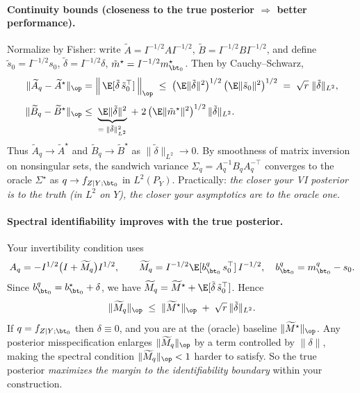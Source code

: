 \paragraph{Continuity bounds (closeness to the true posterior $\Rightarrow$ better performance).}
Normalize by Fisher: write $\widetilde A=I^{-1/2}AI^{-1/2}$, $\widetilde B=I^{-1/2}BI^{-1/2}$, and define $\tilde s_0=I^{-1/2}s_0$, $\tilde\delta=I^{-1/2}\delta$, $\tilde m^\star=I^{-1/2}m^\star_{\bt_0}$.
Then by Cauchy–Schwarz,
\begin{align*}
\|\widetilde A_q-\widetilde A^\star\|_{\op}
&=\Big\|\,\E[\tilde\delta\,\tilde s_0^\top]\,\Big\|_{\op}
\;\le\;\big(\E\|\tilde\delta\|^2\big)^{1/2}\,\big(\E\|\tilde s_0\|^2\big)^{1/2}
\;=\;\sqrt{r}\;\|\tilde\delta\|_{L^2},\\[3pt]
\|\widetilde B_q-\widetilde B^\star\|_{\op}
&\le\;\underbrace{\E\|\tilde\delta\|^2}_{=\;\|\tilde\delta\|_{L^2}^2}
\;+\;2\,\big(\E\|\tilde m^\star\|^2\big)^{1/2}\,\|\tilde\delta\|_{L^2}.
\end{align*}
Thus \(\widetilde A_q\to\widetilde A^\star\) and \(\widetilde B_q\to\widetilde B^\star\) as $\|\tilde\delta\|_{L^2}\to0$.
By smoothness of matrix inversion on nonsingular sets, the sandwich variance
\(\Sigma_q=A_q^{-1}B_qA_q^{-\top}\) converges to the oracle \(\Sigma^\star\) as $q\to f_{Z\mid Y;\bt_0}$ in $L^2(P_Y)$.
Practically: \emph{the closer your VI posterior is to the truth (in $L^2$ on $Y$), the closer your asymptotics are to the oracle one.}

\paragraph{Spectral identifiability improves with the true posterior.}
Your invertibility condition uses
\[
A_q=-I^{1/2}\big(I+\widetilde M_q\big)I^{1/2},\qquad
\widetilde M_q=I^{-1/2}\E[b^q_{\bt_0}\,s_0^\top]\,I^{-1/2},\quad b^q_{\bt_0}=m^q_{\bt_0}-s_0.
\]
Since \(b^q_{\bt_0}=b^\star_{\bt_0}+\delta\), we have
\(\widetilde M_q=\widetilde M^\star+\E[\tilde\delta\,\tilde s_0^\top]\).
Hence
\[
\|\widetilde M_q\|_{\op}
\;\le\;\|\widetilde M^\star\|_{\op}\;+\;\sqrt{r}\,\|\tilde\delta\|_{L^2}.
\]
If \(q=f_{Z\mid Y;\bt_0}\) then $\delta\equiv0$, and you are at the (oracle) baseline
\(\|\widetilde M^\star\|_{\op}\). Any posterior misspecification enlarges $\|\widetilde M_q\|_{\op}$ by a term controlled by $\|\delta\|$, making the spectral condition $\|\widetilde M_q\|_{\op}<1$ harder to satisfy. So the true posterior \emph{maximizes the margin to the identifiability boundary} within your construction.

